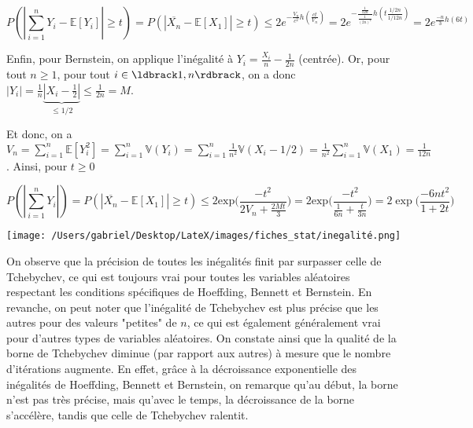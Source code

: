 \documentclass[12pt]{article}
\newcommand{\cercler}[1]{\tikz[baseline=(char.base)]{\node[shape=circle,draw,inner sep=1pt](char){#1};} }
\newcommand{\bb}[1]{\mathbb{#1}} %
\newcommand{\somme}[2]{\sum\limits_{#1}^{#2}}
\newcommand{\esp}[1]{\bb{ E} \mathopen{}\left[#1\right]} %
\newcommand{\Var}[1]{\bb{ V} \mathopen{}\left(#1\right)} %
\newcommand{\1}{\bb{1}} %
\newcommand{\Xbarre}{\overline{X_n}}
\begin{document}
$$P(|\somme{i=1}{n} Y_i-\esp{Y_i} |\ge t)=P(|\Xbarre -\esp{X_1}| \ge t ) \le  2e^{-\frac{V_n}{c^2}h(\frac{ct}{V_n})}  = 2e^{-\frac{\frac{1}{12n}}{\frac{1}{(2n)^2}}h(t\frac{1/2n}{1/12n})} = 2e^{\frac{-n}{3}h(6t)}$$

\cercler 3 Enfin, pour Bernstein, on applique l'inégalité à $Y_i = \frac{X_i}{n}-\frac{1}{2n}$ (centrée). Or, pour tout $n \ge 1$, pour tout $i \in \ldbrack 1,n\rdbrack$, on a donc $|Y_i| = \frac 1n \underbrace{|X_i-\frac 12|}_{\le 1/2} \le \frac{1}{2n} = M$. 


Et donc, on a $V_n = \somme{i=1}{n} \esp{Y_i^2} =  \somme{i=1}{n} \Var{Y_i} = \somme{i=1}{n}\frac{1}{n^2} \Var{X_i-1/2} = \frac{1}{n^2}\somme{i=1}{n} \Var{X_1} = \frac{1}{12n}$. Ainsi, pour $t \ge 0$

$$P(|\somme{i=1}{n} Y_i|)=P(|\Xbarre -\esp{X_1}| \ge t ) \le  2\text{exp}\big(\frac{-t^2}{2V_n + \frac{2Mt}{3}}\big) =  2\text{exp}\big(\frac{-t^2}{\frac{1}{6n} + \frac{t}{3n}}\big) = 2\exp\big( \frac{-6n t^2 }{1+2t}\big)$$



\texttt{[image: /Users/gabriel/Desktop/LateX/images/fiches\_stat/inegalité.png]} 

On observe que la précision de toutes les inégalités finit par surpasser celle de Tchebychev, ce qui est toujours vrai pour toutes les variables aléatoires respectant les conditions spécifiques de Hoeffding, Bennett et Bernstein. En revanche, on peut noter que l'inégalité de Tchebychev est plus précise que les autres pour des valeurs "petites" de $n$, ce qui est également généralement vrai pour d'autres types de variables aléatoires. On constate ainsi que la qualité de la borne de Tchebychev diminue (par rapport aux autres) à mesure que le nombre d'itérations augmente. En effet, grâce à la décroissance exponentielle des inégalités de Hoeffding, Bennett et Bernstein, on remarque qu'au début, la borne n'est pas très précise, mais qu'avec le temps, la décroissance de la borne s'accélère, tandis que celle de Tchebychev ralentit.
\end{document}

